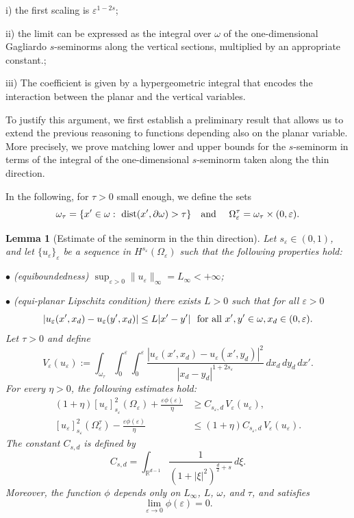 \documentclass[11pt]{article}
\newtheorem{lemma}[definition]{Lemma}
\def\e{\varepsilon}
\begin{document}
\smallskip
i) the first scaling is $\e^{1-2s}$;

\smallskip
ii) the limit can be expressed as the integral over $\omega$ of the one-dimensional Gagliardo 
$s$-seminorms along the vertical sections, multiplied by an appropriate constant.;

\smallskip
iii) The coefficient is given by a hypergeometric integral that encodes the interaction between the planar and the vertical variables.

\smallskip
To justify this argument, we first establish a preliminary result that allows us to extend the previous reasoning to functions depending also on the planar variable. More precisely, we prove matching lower and upper bounds for the 
$s$-seminorm in terms of the integral of the one-dimensional 
$s$-seminorm taken along the thin direction.

In the following, for $\tau>0$ small enough, we define the sets
\[\omega_\tau=\{x^\prime\in\omega: \ \hbox{\rm dist}(x^\prime,\partial\omega)>\tau\}\quad \mbox{and}\quad\  \Omega_\e^\tau=\omega_\tau\times (0,\e).\] 

\begin{lemma}[Estimate of the seminorm in the thin direction]\label{vert-lemma}
Let $s_\e\in(0,1)$, and let $\{u_\e\}_\e$ be a sequence in $H^{s_\e}(\Omega_\e)$ 
such that the following properties hold: 

\indent $\bullet$ (equiboundedness) $\sup_{\e>0}\|u_\e\|_\infty=L_\infty<+\infty$;  

\indent $\bullet$ (equi-planar Lipschitz condition) there exists $L>0$ such that for all $\e>0$ 
\begin{equation*}\label{equilip}
|u_\e(x^\prime, x_d)-u_\e(y^\prime, x_d)|\leq L|x^\prime-y^\prime| \ \ \hbox{\rm for all } x^\prime,y^\prime\in\omega, x_d\in (0,\e). 
\end{equation*}
Let $\tau>0$ and define
\begin{equation}\label{def-vertical}
V_\varepsilon(u_\varepsilon)
:=
\int_{\omega_\tau}
\int_0^\varepsilon
\int_0^\varepsilon
\frac{|u_\varepsilon(x',x_d)-u_\varepsilon(x',y_d)|^2}
{|x_d-y_d|^{1+2s_\varepsilon}}
\,dx_d\,dy_d\,dx'.
\end{equation}
For every $\eta>0$, the following estimates hold:
\begin{align}
(1+\eta)[u_\varepsilon]_{s_\varepsilon}^2(\Omega_\varepsilon)
+\frac{\varepsilon\phi(\varepsilon)}{\eta}
&\ge
C_{s_\varepsilon,d}\,V_\varepsilon(u_\varepsilon),
\label{vert-est1}
\\
[u_\varepsilon]_{s_\varepsilon}^2(\Omega_\varepsilon^\tau)
-\frac{\varepsilon\phi(\varepsilon)}{\eta}
&\le
(1+\eta)C_{s_\varepsilon,d}\,V_\varepsilon(u_\varepsilon).
\label{vert-est2}
\end{align}
The constant $C_{s,d}$ is defined by
\begin{equation}\label{defC}
C_{s,d}
=
\int_{\mathbb{R}^{d-1}}
\frac{1}{(1+|\xi|^2)^{\frac{d}{2}+s}}
\,d\xi.
\end{equation}
Moreover, the function $\phi$ depends only on $L_\infty$, $L$, $\omega$, and $\tau$, and satisfies
\[
\lim_{\varepsilon\to 0}\phi(\varepsilon)=0.
\]
\end{lemma}
\end{document}
